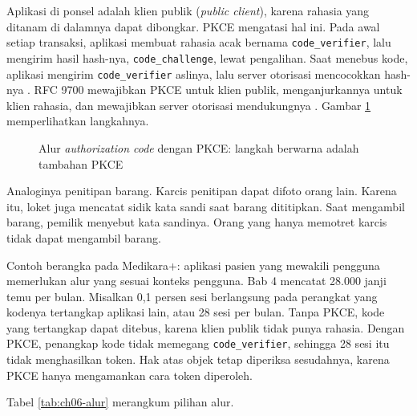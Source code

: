 Aplikasi di ponsel adalah klien publik (\textit{public client}), karena rahasia yang ditanam di dalamnya dapat dibongkar.
PKCE mengatasi hal ini. Pada awal setiap transaksi, aplikasi membuat rahasia acak bernama \texttt{code\_verifier}, lalu
mengirim hasil hash-nya, \texttt{code\_challenge}, lewat pengalihan. Saat menebus kode, aplikasi mengirim
\texttt{code\_verifier} aslinya, lalu server otorisasi mencocokkan hash-nya \cite{c06-rfc7636}. RFC 9700 mewajibkan PKCE
untuk klien publik, menganjurkannya untuk klien rahasia, dan mewajibkan server otorisasi mendukungnya \cite{rfc9700}.
Gambar \ref{fig:ch06-alur-pkce} memperlihatkan langkahnya.

\begin{figure}[!htb]
  \centering
  
  \caption{Alur \textit{authorization code} dengan PKCE: langkah berwarna adalah tambahan PKCE}
  \label{fig:ch06-alur-pkce}
\end{figure}

Analoginya penitipan barang. Karcis penitipan dapat difoto orang lain. Karena itu, loket juga mencatat sidik kata sandi
saat barang dititipkan. Saat mengambil barang, pemilik menyebut kata sandinya. Orang yang hanya memotret karcis tidak
dapat mengambil barang.

Contoh berangka pada Medikara+: aplikasi pasien yang mewakili pengguna memerlukan alur yang sesuai konteks pengguna.
Bab 4 mencatat 28.000 janji temu per bulan. Misalkan 0,1 persen sesi berlangsung pada perangkat yang kodenya tertangkap
aplikasi lain, atau 28 sesi per bulan. Tanpa PKCE, kode yang tertangkap dapat ditebus, karena klien publik tidak punya
rahasia. Dengan PKCE, penangkap kode tidak memegang \texttt{code\_verifier}, sehingga 28 sesi itu tidak menghasilkan
token. Hak atas objek tetap diperiksa sesudahnya, karena PKCE hanya mengamankan cara token diperoleh.

Tabel \ref{tab:ch06-alur} merangkum pilihan alur.

